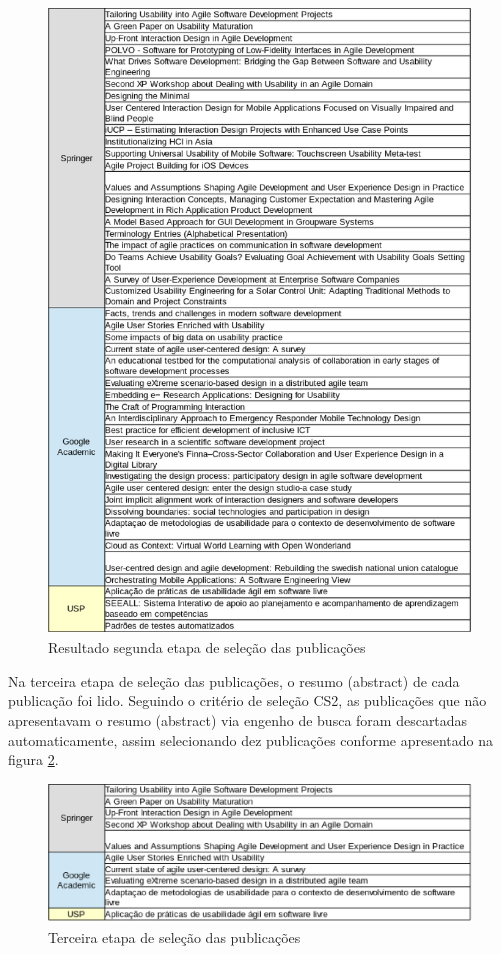 \documentclass[12pt]{article}
\begin{document}
\begin{figure}[hbt]
  \begin{center}
    \includegraphics[width=1\textwidth]{figure/tabela1.eps}
    \caption{Resultado segunda etapa de seleção das publicações}
    \label{fig:tabela1}
  \end{center}
\end{figure}

%
Na terceira etapa de seleção das publicações, o resumo (abstract) de cada publicação foi lido. Seguindo o critério de seleção CS2, as publicações que não apresentavam o resumo (abstract) via engenho de busca foram descartadas automaticamente, assim selecionando dez publicações conforme apresentado na figura \ref{fig:tabela2}.

\begin{figure}[hbt]
  \begin{center}
    \includegraphics[width=1\textwidth]{figure/tabela2.eps}
    \caption{Terceira etapa de seleção das publicações}
    \label{fig:tabela2}
  \end{center}
\end{figure}
\end{document}
